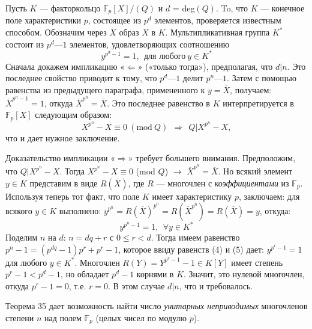 \begin{myproof}
Пусть $K$ — факторкольцо $\mathbb{F}_p[X]\slash(Q)$ и $d$ = deg$(Q)$. To, что $K$ — 
конечное поле характеристики $p$, состоящее из $p^d$ элементов,  
проверяется известным способом. Обозначим через $\overline{X}$ образ $X$ в $K$. 
Мультипликативная группа $K^*$ состоит из $p^d — 1$ элементов,  
удовлетворяющих соотношению 
\begin{equation}
y^{p^d - 1} = 1,\:\: \text{для любого}\: y\in K^*
\end{equation}
Сначала докажем импликацию «$\Leftarrow$» («только тогда»), предполагая, 
что $d | n$. Это последнее свойство приводит к тому, что $p^d — 1$ делит 
$p^n — 1$. Затем с помощью равенства из предыдущего параграфа,  
примененного к $y = \overline{X}$, получаем: $\overline{X}^{p^n -1} = 1$, откуда $\overline{X}^{p^n} = \overline{X}$. 
Это последнее равенство в $K$ интерпретируется в $\mathbb{F}_p [X]$ следующим 
образом: 
\begin{equation*}
X^{p^n} - X \equiv 0\: (\text{mod}\: Q)\:\: \Rightarrow\:\: Q|X^{p^n} - X,
\end{equation*}
что и дает нужное заключение.

\noindent Доказательство импликации «$\Rightarrow$» требует большего внимания. 
Предположим, что $Q | X^{p^n} - X$. Тогда $X^{p^n} - X \equiv 0$ (mod $Q$) $\rightarrow$ 
$\overline{X}^{p^n} = \overline{X}$. Но всякий элемент $y\in K$ представим в виде $R(\overline{X})$, где $R$ 
— многочлен с \textit{коэффициентами} из $\mathbb{F}_p$. Используя теперь тот факт, 
что поле $K$ имеет характеристику $p$, заключаем: для всякого $y \in K$ 
выполнено: $y^{p^n} = R(\overline{X})^{p^n} = R(\overline{X}^{p^n}) = R(\overline{X}) = y$, откуда: 
\begin{equation}
y^{p^n - 1} = 1,\:\: \forall y \in K^*
\end{equation}
Поделим $n$ на $d$: $n = dq + r$ с $0\leqslant r < d$. Тогда имеем равенство
$p^n - 1 = (p^{dq} - 1)p^r + p^r - 1$, которое ввиду равенств (4) и (5) дает:
$y^{p^r - 1} = 1$ для любого $y \in K^*$. Многочлен $R(Y) = Y^{p^r -1} - 1 \in K[Y]$
имеет степень $p^r - 1 < p^d - 1$, но обладает $p^d - 1$ корнями в $K$.
Значит, это нулевой многочлен, откуда $p^r - 1 = 0$, т.е. $r = 0$. В этом
случае $d | n$, что и требовалось.
\end{myproof}

Теорема 35 дает возможность найти число \textit{унитарных неприводимых}
многочленов степени $n$ над полем $\mathbb{F}_p$ (целых чисел по модулю $p$).
 
